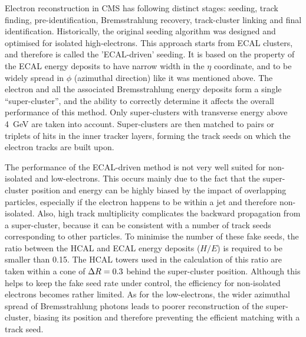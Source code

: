 Electron reconstruction in CMS has following distinct stages: seeding, track finding, pre-identification, Bremsstrahlung
recovery, track-cluster linking and final identification. Historically, the original seeding algorithm was designed and
optimised for isolated high-\pt electrons. This approach starts from ECAL clusters, and therefore is called the
'ECAL-driven' seeding. It is based on the property of the ECAL energy deposits to have narrow width in the $\eta$
coordinate, and to be widely spread in $\phi$ (azimuthal direction) like it was mentioned above. The electron and all
the associated Bremsstrahlung energy deposits form a single ``super-cluster'', and the ability to correctly determine it
affects the overall performance of this method. Only super-clusters with transverse energy above \SI{4}{\GeV} are taken
into account. Super-clusters are then matched to pairs or triplets of hits in the inner tracker layers, forming the
track seeds on which the electron tracks are built upon.

The performance of the ECAL-driven method is not very well suited for non-isolated and low-\pt electrons. This occurs
mainly due to the fact that the super-cluster position and energy can be highly biased by the impact of overlapping
particles, especially if the electron happens to be within a jet and therefore non-isolated. Also, high track
multiplicity complicates the backward propagation from a super-cluster, because it can be consistent with a number of
track seeds corresponding to other particles. To minimise the number of these fake seeds, the ratio between the HCAL and
ECAL energy deposits ($H/E$) is required to be smaller than \num{0.15}. The HCAL towers used in the calculation of this
ratio are taken within a cone of $\Delta R = 0.3$ behind the super-cluster position. Although this helps to keep the fake
seed rate under control, the efficiency for non-isolated electrons becomes rather limited. As for the low-\pt electrons,
the wider azimuthal spread of Bremsstrahlung photons leads to poorer reconstruction of the super-cluster, biasing its
position and therefore preventing the efficient matching with a track seed.

